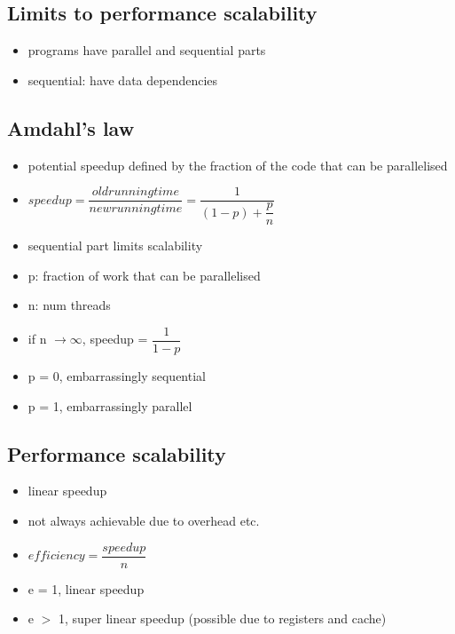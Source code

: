 \documentclass[10pt, multicolumn, a4paper]{article}
\begin{document}
\begin{multicols}{2}
	\subsection*{Limits to performance scalability}
	\begin{itemize}
	\item programs have parallel and sequential parts
	\item sequential: have data dependencies
	\end{itemize}
	\subsection*{Amdahl's law}
	\begin{itemize}
	\item potential speedup defined by the fraction of the code that can be parallelised
	\item $speedup = \dfrac{old running time}{new running time} 
		= \dfrac{1}{(1-p) + \dfrac{p}{n}}$
	\item sequential part limits scalability
	\item p: fraction of work that can be parallelised
	\item n: num threads
	\item if n $\rightarrow \infty$, speedup = $\dfrac{1}{1-p}$
	\item p = 0, embarrassingly sequential
	\item p = 1, embarrassingly parallel
	\end{itemize}
	\subsection*{Performance scalability}
	\begin{itemize}
	\item linear speedup
	\item not always achievable due to overhead etc.
	\item $efficiency = \dfrac{speedup}{n}$
	\item e = 1, linear speedup
	\item e $>$ 1, super linear speedup (possible due to registers and cache)
	\end{itemize}

\end{multicols}
\end{document}
